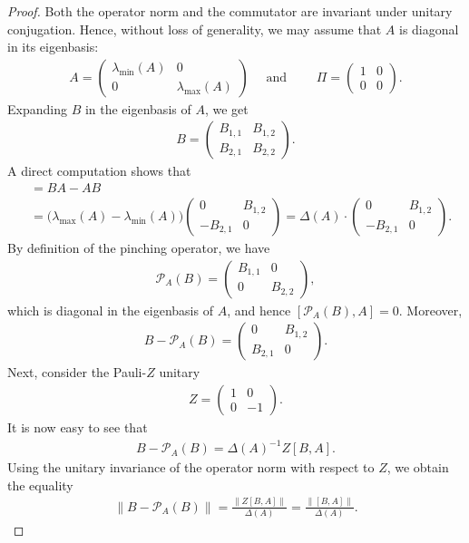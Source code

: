 \documentclass[11pt]{article}
\theoremstyle{plain}
\begin{document}
\begin{proof}
Both the operator norm and the commutator are invariant under unitary conjugation. Hence, without loss of generality, we may assume that $A$ is diagonal in its eigenbasis:
\begin{align}
A =
\begin{pmatrix}
\lambda_{\min}(A) & 0 \\
0 & \lambda_{\max}(A)
\end{pmatrix} \quad \text{ and } \quad
\quad
\Pi =
\begin{pmatrix}
1 & 0 \\
0 & 0
\end{pmatrix}.
\end{align}
Expanding $B$ in the eigenbasis of $A$, we get
\begin{align}
B =
\begin{pmatrix}
B_{1,1} & B_{1,2} \\
B_{2,1} & B_{2,2}
\end{pmatrix}.
\end{align}
A direct computation shows that
\begin{align}
[B,A]
&= BA - AB \\
&= \bigl(\lambda_{\max}(A) - \lambda_{\min}(A)\bigr)
\begin{pmatrix}
0 & B_{1,2} \\
-B_{2,1} & 0
\end{pmatrix}
= \Delta(A) \cdot
\begin{pmatrix}
0 & B_{1,2} \\
-B_{2,1} & 0
\end{pmatrix}.
\end{align}
By definition of the pinching operator, we have
\begin{align}
\mathcal{P}_A(B)
=
\begin{pmatrix}
B_{1,1} & 0 \\
0 & B_{2,2}
\end{pmatrix},
\end{align}
which is diagonal in the eigenbasis of $A$, and hence $[\mathcal{P}_A(B),A]=0$. Moreover,
\begin{align}
B - \mathcal{P}_A(B)
=
\begin{pmatrix}
0 & B_{1,2} \\
B_{2,1} & 0
\end{pmatrix}.
\end{align}
Next, consider the Pauli-$Z$ unitary
\begin{align}
Z=\begin{pmatrix}
1 & 0 \\
0 & -1
\end{pmatrix}.  
\end{align}
It is now easy to see that
\begin{align}
B - \mathcal{P}_A(B) = \Delta(A)^{-1}Z[B,A].
\end{align}
Using the unitary invariance of the operator norm with respect to $Z$,
we obtain the equality
\begin{align}
\|B - \mathcal{P}_A(B)\|
= \frac{\|Z[B,A]\|}{\Delta(A)} = \frac{\|[B,A]\|}{\Delta(A)}.
\end{align}
\end{proof}
\end{document}
